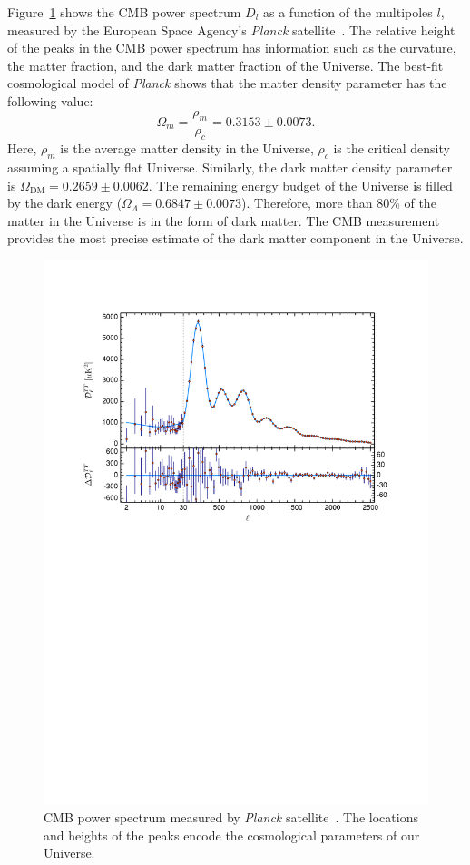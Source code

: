\documentclass[doublespace,nopageskip]{VTthesis}
\begin{document}
Figure~\ref{fig:cmb} shows the CMB power spectrum $D_l$ as a function of the multipoles $l$, measured by the European Space Agency's \emph{Planck} satellite~\cite{2020A&A...641A...6P}. The relative height of the peaks in the CMB power spectrum has information such as the curvature, the matter fraction, and the dark matter fraction of the Universe. The best-fit cosmological model of \textit{Planck} shows that {the matter density parameter has the following value:
\begin{equation}
    \Omega_m = \frac{\rho_m}{\rho_c} = 0.3153 \pm 0.0073.
\end{equation}
Here, $\rho_m$ is the average matter density in the Universe, $\rho_c$ is the critical density assuming a spatially flat Universe. Similarly, the dark matter density parameter is $\Omega_\mathrm{DM} = 0.2659 \pm 0.0062$. The remaining energy budget of the Universe is filled by the dark energy ($\Omega_\Lambda = 0.6847 \pm 0.0073$).} Therefore, more than 80\% of the matter in the Universe is in the form of dark matter. The CMB measurement provides the most precise estimate of the dark matter component in the Universe.
\begin{figure}[htb]
    \centering
    \includegraphics[width=\textwidth]{Figures/Intro/Planck_CMB.pdf}
    \caption{CMB power spectrum measured by \emph{Planck} satellite~\cite{2020A&A...641A...6P}. The locations and heights of the peaks encode the cosmological parameters of our Universe.}
    \label{fig:cmb}
\end{figure}
\end{document}
